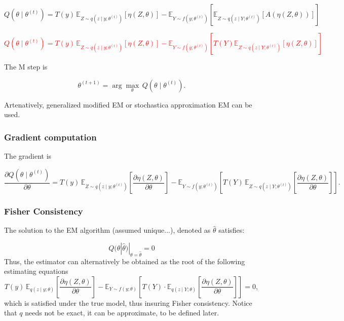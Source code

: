 \documentclass[twoside,11pt]{article}
\begin{document}

\textcolor{softgreen}{
$$
Q(\theta \mid \theta^{(t)}) = T(y) \, \mathbb{E}_{Z\sim q(z \mid y; \theta^{(t)})} \left[ {\eta(Z, \theta)} \right] - \mathbb{E}_{Y\sim f(y;\theta^{(t)})} \left[ \mathbb{E}_{Z \sim q(z \mid Y; \theta^{(t)})} \left[ A(\eta(Z, \theta)) \right] \right]
$$
}



\textcolor{red}{
$$
Q(\theta \mid \theta^{(t)}) = T(y) \, \mathbb{E}_{Z\sim q(z \mid y; \theta^{(t)})} \left[ {\eta(Z, \theta)} \right] - \mathbb{E}_{Y\sim f(y;\theta^{(t)})} \left[ T(Y)\mathbb{E}_{Z\sim q(z \mid Y; \theta^{(t)})} \left[ \eta(Z, \theta) \right] \right]
$$
}




The M step is

$$
\theta^{(t+1)} = \arg \max_\theta \, Q(\theta \mid \theta^{(t)}).
$$

Artenatively, generalized modified EM or stochastica approximation EM can be used.


\subsubsection{Gradient computation}
The gradient is

$$
\frac{\partial Q(\theta \mid \theta^{(t)})}{\partial \theta} = T(y) \, \mathbb{E}_{Z \sim q(z \mid y; \theta^{(t)})} \left[ \frac{\partial \eta(Z, \theta)}{\partial \theta} \right] - \mathbb{E}_{Y \sim f(y; \theta^{(t)})} \left[ T(Y) \, \mathbb{E}_{Z \sim q(z \mid Y; \theta^{(t)})} \left[ \frac{\partial \eta(Z, \theta)}{\partial \theta} \right] \right].
$$



\subsubsection{Fisher Consistency}
The solution to the EM algorithm (assumed unique...), denoted as $\hat\theta$ satisfies:

$$
Q(\theta|\hat\theta)|_{\theta=\hat\theta} = 0
$$
%
Thus, the estimator can alternatively be obtained as the root of the following estimating equations
%
$$
T(y) \, \mathbb{E}_{q(z \mid y; \theta)} \left[ \frac{\partial {\eta(Z, 
 \theta)}}{\partial \theta} \right] - \mathbb{E}_{Y \sim f(y; \theta)} \left[ T(Y) \cdot \mathbb{E}_{q(z \mid Y; \theta)} \left[ \frac{\partial {\eta(Z, \theta)}}{\partial \theta} \right] \right] = 0,
$$
%
which is satisfied under the  true model, thus insuring Fisher consistency. Notice that $q$ needs not be exact, it can be approximate, to be defined later.
\end{document}
